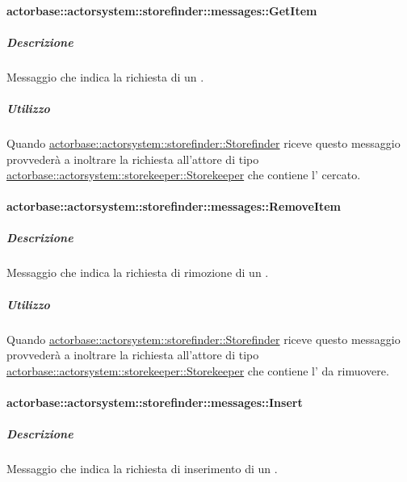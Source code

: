 \documentclass{scalatekids-article}
\begin{document}
\paragraph{actorbase::actorsystem::storefinder::messages::GetItem}
\label{sec:actorbase::actorsystem::storefinder::messages::GetItem}

\subparagraph{Descrizione}

Messaggio che indica la richiesta di un .

\subparagraph{Utilizzo}

Quando \hyperref[sec:actorbase::actorsystem::storefinder::Storefinder]{actorbase::\allowbreak{}actorsystem::\allowbreak{}storefinder::\allowbreak{}Storefinder}
riceve questo messaggio provvederà a inoltrare la richiesta all'attore di tipo
\hyperref[sec:actorbase::actorsystem::storekeeper::Storekeeper]{actorbase::\allowbreak{}actorsystem::\allowbreak{}storekeeper::\allowbreak{}Storekeeper}
che contiene l' cercato.

\paragraph{actorbase::actorsystem::storefinder::messages::RemoveItem}
\label{sec:actorbase::actorsystem::storefinder::messages::RemoveItem}

\subparagraph{Descrizione}

Messaggio che indica la richiesta di rimozione di un .

\subparagraph{Utilizzo}

Quando \hyperref[sec:actorbase::actorsystem::storefinder::Storefinder]{actorbase::\allowbreak{}actorsystem::\allowbreak{}storefinder::\allowbreak{}Storefinder}
riceve questo messaggio provvederà a inoltrare la richiesta all'attore di tipo
\hyperref[sec:actorbase::actorsystem::storekeeper::Storekeeper]{actorbase::\allowbreak{}actorsystem::\allowbreak{}storekeeper::\allowbreak{}Storekeeper}
che contiene l' da rimuovere.

\paragraph{actorbase::actorsystem::storefinder::messages::Insert}
\label{sec:actorbase::actorsystem::storefinder::messages::Insert}

\subparagraph{Descrizione}

Messaggio che indica la richiesta di inserimento di un .
\end{document}
